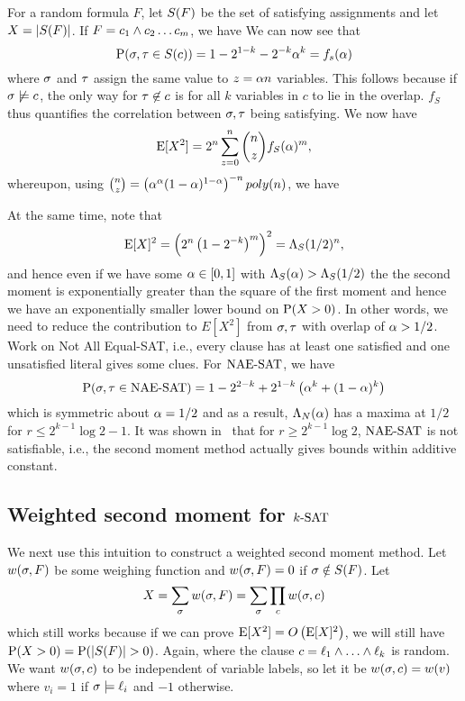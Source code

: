\documentclass[letterpaper, 10pt, twocolumn, reqno]{amsart}
\begin{document}
For a random formula $F$, let $\sf$ be the set of satisfying assignments and let $X = \abs{\sf}$. If $F = c_1 \aand c_2 \ldots c_m$, we have
We can now see that
$$
\P(\s,\t \in \sc) = 1 -2^{1-k} - 2^{-k}\a^k = f_s(\a)
$$
where $\s$ and $\t$ assign the same value to $z = \a n$ variables. This follows because if $\s \not\sat c$, the only way for $\t \not\in c$ is for all $k$ variables in $c$ to lie in the overlap. $f_S$ thus quantifies the correlation between $\s,\t$ being satisfying. We now have
$$
\E[X^2] = 2^n \sum_{z=0}^n {n \choose z} f_S(\a)^m,
$$
whereupon, using ${n \choose z} = \rbrac{\a^\a (1-\a)^{1-\a}}^{-n} poly(n)$, we have

At the same time, note that
$$
\E[X]^2 = \rbrac{2^n \rbrac{1 - 2^{-k}}^m }^2 = \L_S(1/2)^n,
$$
and hence even if we have some $\a \in [0,1]$ with $\L_S(\a) > \L_S(1/2)$ the
the second moment is exponentially greater than the square of the first moment and hence we have an exponentially smaller lower bound on $\P(X > 0)$. In
other words, we need to reduce the contribution to $E[X^2]$ from $\s,\t$ with overlap of $\a > 1/2$. Work on Not All Equal-SAT, i.e., every clause has at
least one satisfied and one unsatisfied literal gives some clues. For $\NAESAT$, we have
$$
\P(\s,\t \in \NAESAT) = 1 - 2^{2-k} + 2^{1-k} \rbrac{\a^k + (1-\a)^k}
$$
which is symmetric about $\a = 1/2$ and as a result, $\L_N(\a)$ has a maxima at $1/2$ for $r \leq 2^{k-1} \log2 -1$. It was shown in~\cite{achlioptas2002asymptotic} that for $r \geq 2^{k-1} \log2$, $\NAESAT$ is not satisfiable, i.e., the second moment method actually gives bounds within additive constant.

\subsection{Weighted second moment for $\ksat$}
\label{ssec:ksat_weighted}
We next use this intuition to construct a weighted second moment method. Let $\wsf$ be some weighing function and $\wsf = 0$ if $\s \notin \sf$. Let
$$X = \sum_\s \wsf = \sum_\s \prod_c \wsc$$
which still works because if we can prove $\E[X^2] = \bigo\rbrac{\E[X]^2}$, we will still have $\P(X > 0) = \P(\abs{\sf} > 0)$. Again,
where the clause $c = \ell_1 \aand \ldots \aand \ell_k$ is random. We want $\wsc$ to be independent of variable labels, so let it be $\wsc = \wv$ where $v_i =1$ if $\s \sat \ell_i$ and $-1$ otherwise.
\end{document}
